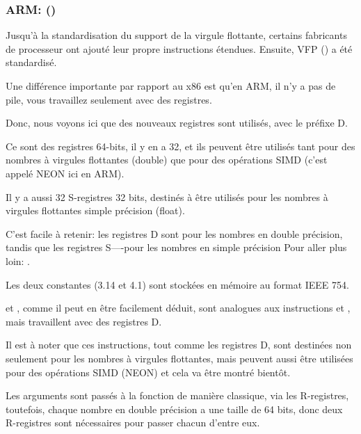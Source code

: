 \subsubsection{ARM: \OptimizingXcodeIV (\ARMMode)}

Jusqu'à la standardisation du support de la virgule flottante, certains fabricants
de processeur ont ajouté leur propre instructions étendues.
Ensuite, VFP () a été standardisé.

Une différence importante par rapport au x86 est qu'en ARM, il n'y a pas de pile,
vous travaillez seulement avec des registres.




Donc, nous voyons ici que des nouveaux registres sont utilisés, avec le préfixe D.

Ce sont des registres 64-bits, il y en a 32, et ils peuvent être utilisés tant pour
des nombres à virgules flottantes (double) que pour des opérations SIMD (c'est appelé
NEON ici en ARM).

Il y a aussi 32 S-registres 32 bits, destinés à être utilisés pour les nombres à
virgules flottantes simple précision (float).

C'est facile à retenir: les registres D sont pour les nombres en double précision,
tandis que les registres S----pour les nombres en simple précision
Pour aller plus loin: .

Les deux constantes (3.14 et 4.1) sont stockées en mémoire au format IEEE 754.

 et , comme il peut en être facilement déduit, sont analogues
aux instructions  et \MOV, mais travaillent avec des registres D.

Il est à noter que ces instructions, tout comme les registres D, sont destinées non
seulement pour les nombres à virgules flottantes, mais peuvent aussi être utilisées
pour des opérations SIMD (NEON) et cela va être montré bientôt.

Les arguments sont passés à la fonction de manière classique, via les R-registres,
toutefois, chaque nombre en double précision a une taille de 64 bits, donc deux
R-registres sont nécessaires pour passer chacun d'entre eux.

